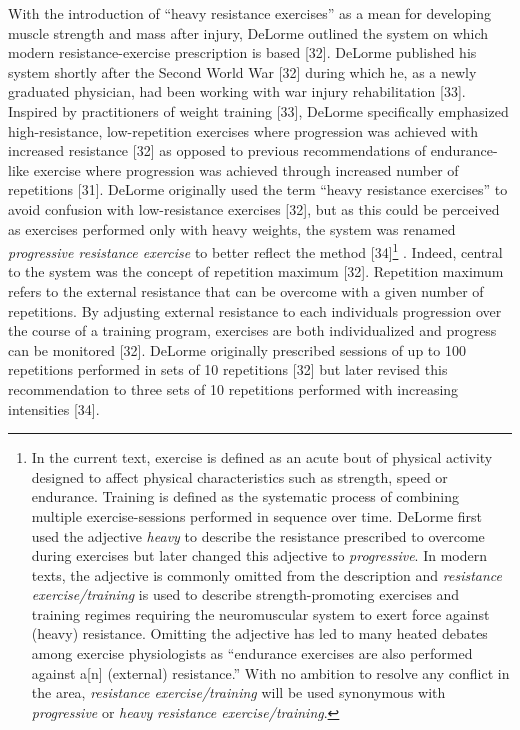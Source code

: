 \documentclass[twoside,10pt]{gihclass} %
\begin{document}
With the introduction of ``heavy resistance exercises'' as a mean for developing muscle strength and mass after injury, DeLorme outlined the system on which modern resistance-exercise prescription is based {[}32{]}.
DeLorme published his system shortly after the Second World War {[}32{]}
during which he, as a newly graduated physician, had been working with war injury rehabilitation
{[}33{]}.
Inspired by practitioners of weight training {[}33{]},
DeLorme specifically emphasized high-resistance, low-repetition exercises where progression was achieved with increased resistance {[}32{]} as opposed to previous recommendations of endurance-like exercise where progression was achieved through increased number of repetitions
{[}31{]}.
DeLorme originally used the term ``heavy resistance exercises'' to avoid confusion with low-resistance exercises {[}32{]}, but as this could be perceived as exercises performed only with heavy weights, the system was renamed \emph{progressive resistance exercise} to better reflect the method
{[}34{]}\footnote{In the current text, exercise is defined as an acute bout of physical activity designed to affect physical characteristics such as strength, speed or endurance. Training is defined as the systematic process of combining multiple exercise-sessions performed in sequence over time. DeLorme first used the adjective \emph{heavy} to describe the resistance prescribed to overcome during exercises but later changed this adjective to \emph{progressive}. In modern texts, the adjective is commonly omitted from the description and \emph{resistance exercise/training} is used to describe strength-promoting exercises and training regimes requiring the neuromuscular system to exert force against (heavy) resistance. Omitting the adjective has led to many heated debates among exercise physiologists as ``endurance exercises are also performed against a{[}n{]} (external) resistance.'' With no ambition to resolve any conflict in the area, \emph{resistance exercise/training} will be used synonymous with \emph{progressive} or \emph{heavy} \emph{resistance exercise/training}.}
.
Indeed, central to the system was the concept of repetition maximum {[}32{]}.
Repetition maximum refers to the external resistance that can be overcome with a given number of repetitions.
By adjusting external resistance to each individuals progression over the course of a training program, exercises are both individualized and progress can be monitored {[}32{]}.
DeLorme originally prescribed sessions of up to 100 repetitions performed in sets of 10 repetitions {[}32{]} but later revised this recommendation to three sets of 10 repetitions performed with increasing intensities
{[}34{]}.
\end{document}
